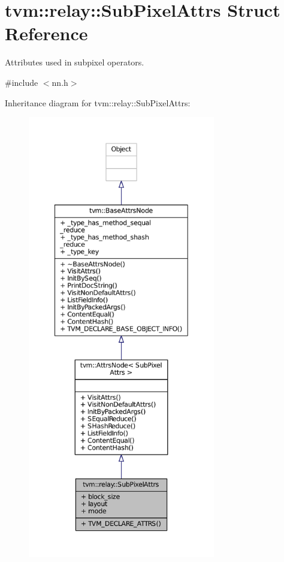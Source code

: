 \hypertarget{structtvm_1_1relay_1_1SubPixelAttrs}{}\section{tvm\+:\+:relay\+:\+:Sub\+Pixel\+Attrs Struct Reference}
\label{structtvm_1_1relay_1_1SubPixelAttrs}


Attributes used in subpixel operators.  




{\ttfamily \#include $<$nn.\+h$>$}



Inheritance diagram for tvm\+:\+:relay\+:\+:Sub\+Pixel\+Attrs\+:
\nopagebreak
\begin{figure}[H]
\begin{center}
\leavevmode
\includegraphics[height=550pt]{structtvm_1_1relay_1_1SubPixelAttrs__inherit__graph}
\end{center}
\end{figure}


